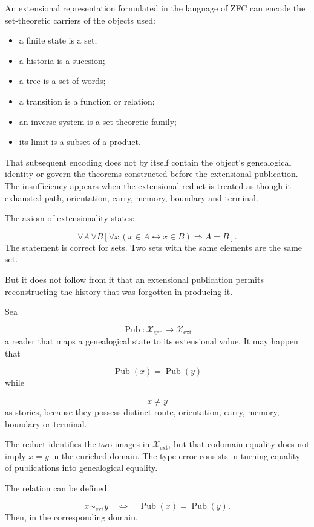 An extensional representation formulated in the language of ZFC can encode the set-theoretic carriers of the objects used:\par
\begin{itemize}
\item a finite state is a set;
\item a historia is a sucesion;
\item a tree is a set of words;
\item a transition is a function or relation;
\item an inverse system is a set-theoretic family;
\item its limit is a subset of a product.
\end{itemize}
That subsequent encoding does not by itself contain the object's genealogical identity or govern the theorems constructed before the extensional publication. The insufficiency appears when the extensional reduct is treated as though it exhausted path, orientation, carry, memory, boundary and terminal.\par
The axiom of extensionality states:\par
\[
\forall A\,\forall B
\left[
\forall x\,
(x\in A\leftrightarrow x\in B)
\Rightarrow A=B
\right].
\]
The statement is correct for sets. Two sets with the same elements are the same set.\par
But it does not follow from it that an extensional publication permits reconstructing the history that was forgotten in producing it.\par
Sea\par
\[
\operatorname{Pub}:
\mathscr X_{\mathrm{gen}}
\longrightarrow
\mathscr X_{\mathrm{ext}}
\]
a reader that maps a genealogical state to its extensional value. It may happen that\par
\[
\operatorname{Pub}(x)
=
\operatorname{Pub}(y)
\]
while\par
\[
x\neq y
\]
as stories, because they possess distinct route, orientation, carry, memory, boundary or terminal.\par
The reduct identifies the two images in \(\mathscr X_{\mathrm{ext}}\), but that codomain equality does not imply \(x=y\) in the enriched domain. The type error consists in turning equality of publications into genealogical equality.\par
The relation can be defined.\par
\[
x\sim_{\mathrm{ext}}y
\quad\Longleftrightarrow\quad
\operatorname{Pub}(x)
=
\operatorname{Pub}(y).
\]
Then, in the corresponding domain,\par
